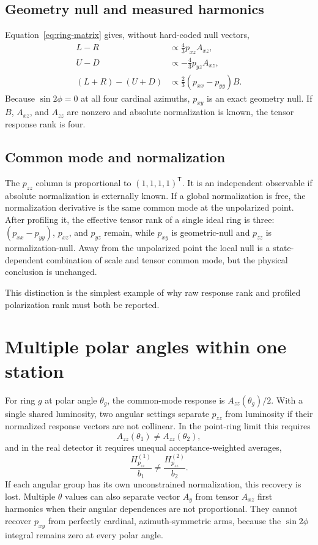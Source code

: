 \documentclass[11pt,a4paper]{article}
\begin{document}
\subsection{Geometry null and measured harmonics}

Equation~\eqref{eq:ring-matrix} gives, without hard-coded null vectors,
\begin{align}
 L-R&\propto\frac43p_{xz}A_{xz},\\
 U-D&\propto-\frac43p_{yz}A_{xz},\\
 (L+R)-(U+D)&\propto\frac23(p_{xx}-p_{yy})B.
\end{align}
Because $\sin2\phi=0$ at all four cardinal azimuths, $p_{xy}$ is an exact
geometry null.  If $B$, $A_{xz}$, and $A_{zz}$ are nonzero and absolute
normalization is known, the tensor response rank is four.

\subsection{Common mode and normalization}

The $p_{zz}$ column is proportional to $(1,1,1,1)^{\mathsf T}$.  It is an
independent observable if absolute normalization is externally known.  If a
global normalization is free, the normalization derivative is the same common
mode at the unpolarized point.  After profiling it, the effective tensor rank
of a single ideal ring is three: $(p_{xx}-p_{yy})$, $p_{xz}$, and $p_{yz}$
remain, while $p_{xy}$ is geometric-null and $p_{zz}$ is normalization-null.
Away from the unpolarized point the local null is a state-dependent combination
of scale and tensor common mode, but the physical conclusion is unchanged.

This distinction is the simplest example of why raw response rank and profiled
polarization rank must both be reported.

\section{Multiple polar angles within one station}

For ring $g$ at polar angle $\theta_g$, the common-mode response is
$A_{zz}(\theta_g)/2$.  With a single shared luminosity, two angular settings
separate $p_{zz}$ from luminosity if their normalized response vectors are not
collinear.  In the point-ring limit this requires
\begin{equation}
 A_{zz}(\theta_1)\neq A_{zz}(\theta_2),
 \label{eq:multi-theta-condition}
\end{equation}
and in the real detector it requires unequal acceptance-weighted averages,
\begin{equation}
 \frac{H^{(1)}_{p_{zz}}}{b_1}\neq
 \frac{H^{(2)}_{p_{zz}}}{b_2}.
\end{equation}
If each angular group has its own unconstrained normalization, this recovery is
lost.  Multiple $\theta$ values can also separate vector $A_y$ from tensor
$A_{xz}$ first harmonics when their angular dependences are not proportional.
They cannot recover $p_{xy}$ from perfectly cardinal, azimuth-symmetric arms,
because the $\sin2\phi$ integral remains zero at every polar angle.
\end{document}
